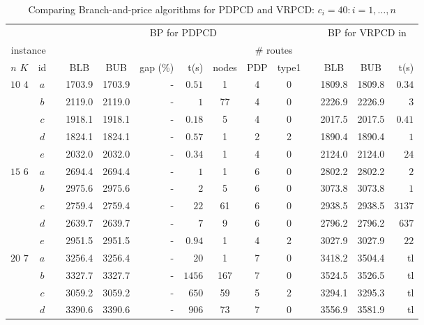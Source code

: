 \begin{table}[!htb]
\footnotesize
\caption{Comparing Branch-and-price algorithms for PDPCD and VRPCD: $c_i = 40:i
= 1,\dots,n$}
\begin{tabular}{cccccrrccccccr}
\multicolumn{2}{c}{} & & \multicolumn{7}{c}{BP for PDPCD} & &
\multicolumn{3}{c}{BP for VRPCD in \cite{inoc11}} \\
\cline{4-10} \cline{12-14}
 \multicolumn{2}{c}{instance} & & & & & & & \multicolumn{2}{c}{\# routes} & & & & \\
 \cline{1-2} \cline{9-10}
$n$ \hspace{4mm} $K$ & id & & BLB & BUB & gap (\%) & t(s) & nodes & PDP &
type1 &
& BLB & BUB & t(s) \\
\hline
\multirow{5}{*}{$10$ \hspace{5mm} $4$}
& $a$ & & 1703.9 & 1703.9 & - & $0.51$ & 1 & 4 & 0 & & 1809.8 & 1809.8 & $0.34$ \\
& $b$ & & 2119.0 & 2119.0 & - & $1$ & 77 & 4 & 0 & & 2226.9 & 2226.9 & $3$ \\
& $c$ & & 1918.1 & 1918.1 & - & $0.18$ & 5 & 4 & 0 & & 2017.5 & 2017.5 & $0.41$ \\
& $d$ & & 1824.1 & 1824.1 & - & $0.57$ & 1 & 2 & 2 & & 1890.4 & 1890.4 & $1$ \\
& $e$ & & 2032.0 & 2032.0 & - & $0.34$ & 1 & 4 & 0 & & 2124.0 & 2124.0 & $24$ \\
\hline
\multirow{5}{*}{$15$  \hspace{5mm} $6$}
& $a$ & & 2694.4 & 2694.4 & - & $1$ & 1 & 6 & 0 & & 2802.2 & 2802.2 & $2$ \\
& $b$ & & 2975.6 & 2975.6 & - & $2$ & 5 & 6 & 0 & & 3073.8 & 3073.8 & $1$ \\
& $c$ & & 2759.4 & 2759.4 & - & $22$ & 61 & 6 & 0 & & 2938.5 & 2938.5 & $3137$ \\
& $d$ & & 2639.7 & 2639.7 & - & $7$ & 9 & 6 & 0 & & 2796.2 & 2796.2 & $637$ \\
& $e$ & & 2951.5 & 2951.5 & - & $0.94$ & 1 & 4 & 2 & & 3027.9 & 3027.9 & $22$ \\
\hline
\multirow{5}{*}{$20$  \hspace{5mm} $7$}
& $a$ & & 3256.4 & 3256.4 & - & $20$ & 1 & 7 & 0 & & 3418.2 & 3504.4 & tl \\
& $b$ & & 3327.7 & 3327.7 & - & $1456$ & 167 & 7 & 0 & & 3524.5 & 3526.5 & tl \\
& $c$ & & 3059.2 & 3059.2 & - & $650$ & 59 & 5 & 2 & & 3294.1 & 3295.3 & tl \\
& $d$ & & 3390.6 & 3390.6 & - & $906$ & 73 & 7 & 0 & & 3556.9 & 3581.9 & tl \\

\end{tabular}
\end{table}
